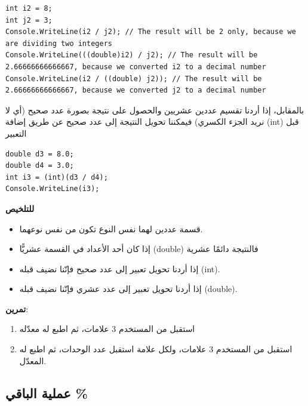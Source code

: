 \documentclass[14pt]{extarticle}
\begin{document}
\begin{boxExample}
\begin{english}
\begin{verbatim}
int i2 = 8;
int j2 = 3;
Console.WriteLine(i2 / j2); // The result will be 2 only, because we are dividing two integers
Console.WriteLine(((double)i2) / j2); // The result will be 2.66666666666667, because we converted i2 to a decimal number
Console.WriteLine(i2 / ((double) j2)); // The result will be 2.66666666666667, because we converted j2 to a decimal number
\end{verbatim}
\end{english}
\end{boxExample}

بالمقابل، إذا أردنا تقسيم عددين عشريين والحصول على نتيجة بصورة عدد صحيح (أي لا نريد الجزء الكسري) فيمكننا تحويل النتيجة إلى عدد صحيح عن طريق إضافة \textenglish{(int)} قبل التعبير

\begin{boxExample}
\begin{english}
\begin{verbatim}
double d3 = 8.0;
double d4 = 3.0;
int i3 = (int)(d3 / d4);
Console.WriteLine(i3);
\end{verbatim}
\end{english}
\end{boxExample}

\textbf{للتلخيص}

\begin{itemize}
\item قسمة عددين لهما نفس النوع تكون من نفس نوعهما.
\item إذا كان أحد الأعداد في القسمة عشريًّا (\textenglish{double}) فالنتيجة دائمًا عشرية
\item إذا أردنا تحويل تعبير إلى عدد صحيح فإنّنا نضيف قبله \textenglish{(int)}.
\item إذا أردنا تحويل تعبير إلى عدد عشري فإنّنا نضيف قبله \textenglish{(double)}.
\end{itemize}

\textbf{تمرين}:
\begin{enumerate}
\item استقبل من المستخدم 3 علامات، ثم اطبع له معدّله
\item استقبل من المستخدم 3 علامات، ولكل علامة استقبل عدد الوحدات، ثم اطبع له المعدّل.
\end{enumerate}

\subsection{عملية الباقي \textenglish{\%}}
\end{document}
